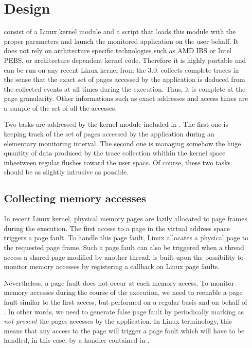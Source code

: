 \section{Design}
\label{sec:design}

\Moca consist of a Linux kernel module and a script that loads this module with
the proper parameters and launch the monitored application on the user behalf.
It does not rely on architecture specific
technologies such as AMD IBS or Intel PEBS, or architecture dependent kernel
code. Therefore it is highly portable and can be run on any recent Linux kernel
from the 3.0. \Moca collects complete traces in the sense that the exact set
of pages accessed by the application is deduced from the collected events
at all times during the execution. Thus, it is complete at the page granularity.
Other informations such as exact addresses and access times are a sample of
the set of all the accesses.

Two tasks are addressed by the kernel module included in \Moca. The first one is
keeping track of the set of pages accessed by the application during an elementary monitoring
interval. The second one is managing somehow the huge quantity of data produced
by the trace collection whithin the kernel space inbeetween regular flushes toward
the user space. Of course, these two tasks should be as slightly intrusive as possible.

\subsection{Collecting memory accesses}

In recent Linux kernel, physical memory pages are lazily allocated to page frames during
the execution. The first access to a page in the virtual address space triggers a page fault.
To handle this page fault, Linux allocates a physical page to the requested page frame.
Such a page fault can also be triggered when a thread access a shared page modified by
another thread. \Moca is built upon the possibility to monitor memory accesses by registering
a callback on Linux page faults.

Nevertheless, a page fault does not occur at each memory access. To monitor memory accesses during
the course of the execution, we need to reenable a page fault similar to the first access, but
performed on a regular basis and on behalf of \Moca.
In other words, we need to generate false page fault by periodically marking as \emph{not present}
the pages accesses by the application.
In Linux terminology, this means that any access to the page will trigger a page fault which
will have to be handled, in this case, by a handler contained in \Moca.


